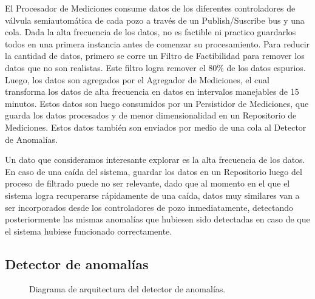 \documentclass{article}
\theoremstyle{definition}
\theoremstyle{remark}
\begin{document}
El Procesador de Mediciones consume datos de los diferentes controladores de válvula semiautomática de cada pozo a través de un Publish/Suscribe bus y una cola. Dada la alta frecuencia de los datos, no es factible ni practico guardarlos todos en una primera instancia antes de comenzar su procesamiento. Para reducir la cantidad de datos, primero se corre un Filtro de Factibilidad para remover los datos que no son realistas. Este filtro logra remover el 80\% de los datos espurios. Luego, los datos son agregados por el Agregador de Mediciones, el cual transforma los datos de alta frecuencia en datos en intervalos manejables de 15 minutos. Estos datos son luego consumidos por un Persistidor de Mediciones, que guarda los datos procesados y de menor dimensionalidad en un Repositorio de Mediciones. Estos datos también son enviados por medio de una cola al Detector de Anomalías.

Un dato que consideramos interesante explorar es la alta frecuencia de los datos. En caso de una caída del sistema, guardar los datos en un Repositorio luego del proceso de filtrado puede no ser relevante, dado que al momento en el que el sistema logra recuperarse rápidamente de una caída, datos muy similares van a ser incorporados desde los controladores de pozo inmediatamente, detectando posteriormente las mismas anomalías que hubiesen sido detectadas en caso de que el sistema hubiese funcionado correctamente.

\subsection{Detector de anomalías} \label{detector_anomalias}

\begin{figure}[H]
	\caption{Diagrama de arquitectura del detector de anomalías.}
\end{figure}
\end{document}
